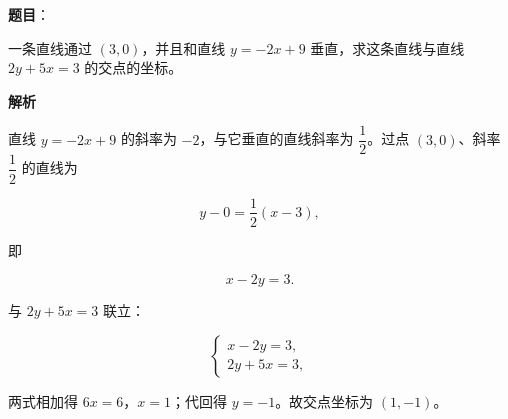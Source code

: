 \begin{answer}

\textbf{题目}：

一条直线通过 $(3,0)$，并且和直线 $y=-2x+9$ 垂直，求这条直线与直线 $2y+5x=3$ 的交点的坐标。

\textbf{解析}

直线 $y=-2x+9$ 的斜率为 $-2$，与它垂直的直线斜率为 $\dfrac{1}{2}$。过点 $(3,0)$、斜率 $\dfrac{1}{2}$ 的直线为

\nopagebreak[4]
\[
y-0=\frac{1}{2}(x-3),
\]

即

\nopagebreak[4]
\[
x-2y=3.
\]

与 $2y+5x=3$ 联立：

\nopagebreak[4]
\[
\begin{cases}
x-2y=3,\\
2y+5x=3,
\end{cases}
\]

两式相加得 $6x=6$，$x=1$；代回得 $y=-1$。故交点坐标为 $(1,-1)$。


\end{answer}
